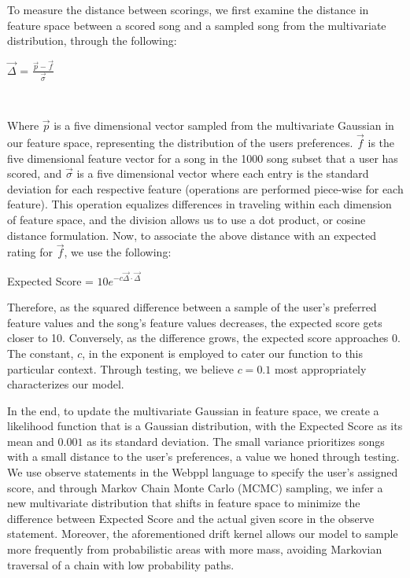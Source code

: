 \documentclass{amsart}
\theoremstyle{plain}
\theoremstyle{definition}
\begin{document}
  	To measure the distance between scorings, we first examine the distance in feature space between a scored song and a sampled song from the multivariate distribution, through the following: \\
  	
 	\begin{center}
 		$\vec{\Delta}$ = $\frac{\vec{p} - \vec{f}}{\vec{\sigma}}$
 	\end{center} \
 
   	\noindent Where $\vec{p}$ is a five dimensional vector sampled from the multivariate Gaussian in our feature space, representing the distribution of the users preferences. $\vec{f}$ is the five dimensional feature vector for a song in the 1000 song subset that a user has scored, and $\vec{\sigma}$ is a five dimensional vector where each entry is the standard deviation for each respective feature (operations are performed piece-wise for each feature). This operation equalizes differences in traveling within each dimension of feature space, and the division allows us to use a dot product, or cosine distance formulation. Now, to associate the above distance with an expected rating for $\vec{f}$, we use the following: \\
   	
   	\begin{center}
  		Expected Score = $10e^{-c\vec{\Delta} \cdot \vec{\Delta}}$
  	\end{center}
  	
  	Therefore, as the squared difference between a sample of the user's preferred feature values and the song's feature values decreases, the expected score gets closer to 10. Conversely, as the difference grows, the expected score approaches 0. The constant, $c$, in the exponent is employed to cater our function to this particular context. Through testing, we believe $c = 0.1$ most appropriately characterizes our model. 
  	
  	In the end, to update the multivariate Gaussian in feature space, we create a likelihood function that is a Gaussian distribution, with the Expected Score as its mean and $0.001$ as its standard deviation. The small variance prioritizes songs with a small distance to the user's preferences, a value we honed through testing. We use observe statements in the Webppl language to specify the user's assigned score, and through Markov Chain Monte Carlo (MCMC) sampling, we infer a new multivariate distribution that shifts in feature space to minimize the difference between Expected Score and the actual given score in the observe statement. Moreover, the aforementioned drift kernel allows our model to sample more frequently from probabilistic areas with more mass, avoiding Markovian traversal of a chain with low probability paths.
  	
\end{document}
